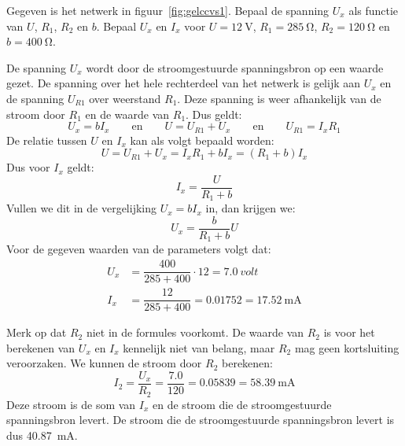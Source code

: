 \begin{example}
Gegeven is het netwerk in figuur~\ref{fig:gelccvs1}. Bepaal de spanning $U_x$ als functie van $U$, $R_1$, $R_2$ en $b$. Bepaal $U_x$ en $I_x$ voor $U=\SI{12}{\volt}$, $R_1=\SI{285}{\ohm}$, $R_2=\SI{120}{\ohm}$ en $b=\SI{400}{\ohm}$.

\begin{center}
\label{fig:gelccvs1}
\end{center}

De spanning $U_x$ wordt door de stroomgestuurde spanningsbron op een waarde gezet. De spanning over het hele rechterdeel van het netwerk is gelijk aan $U_x$ en de spanning $U_{R1}$ over weerstand $R_1$. Deze spanning is weer afhankelijk van de stroom door $R_1$ en de waarde van $R_1$. Dus geldt:
%
\begin{equation}
U_x = bI_x \qquad\text{en}\qquad U = U_{R1}+U_x \qquad\text{en}\qquad U_{R1} = I_xR_1
\end{equation}
%
De relatie tussen $U$ en $I_x$ kan als volgt bepaald worden:
%
\begin{equation}
U = U_{R1} + U_x = I_xR_1 + bI_x = (R_1+b)I_x
\end{equation}
%
Dus voor $I_x$ geldt:
%
\begin{equation}
I_x = \dfrac{U}{R_1+b}
\end{equation}
%
Vullen we dit in de vergelijking $U_x = bI_x$ in, dan krijgen we:
\begin{equation}
U_x = \dfrac{b}{R_1+b}U
\end{equation}
%
Voor de gegeven waarden van de parameters volgt dat:
%
\begin{equation}
\begin{split}
U_x &= \dfrac{400}{285+400}\cdot12 = \SI{7.0}{volt} \\
I_x &= \dfrac{12}{285+400} = \num{0.01752} = \SI{17.52}{\mA}
\end{split}
\end{equation}

Merk op dat $R_2$ niet in de formules voorkomt. De waarde van $R_2$ is voor het berekenen van $U_x$ en $I_x$ kennelijk niet van belang, maar $R_2$ mag geen kortsluiting veroorzaken. We kunnen de stroom door $R_2$ berekenen:
%
\begin{equation}\label{key}
I_2 = \dfrac{U_x}{R_2} = \dfrac{\num{7.0}}{\num{120}} = \num{0.05839} = \SI{58,39}{\mA}
\end{equation}
%
Deze stroom is de som van $I_x$ en de stroom die de stroomgestuurde spanningsbron levert. De stroom die de stroomgestuurde spanningsbron levert is dus \SI{40.87}{\mA}. 
\end{example}


